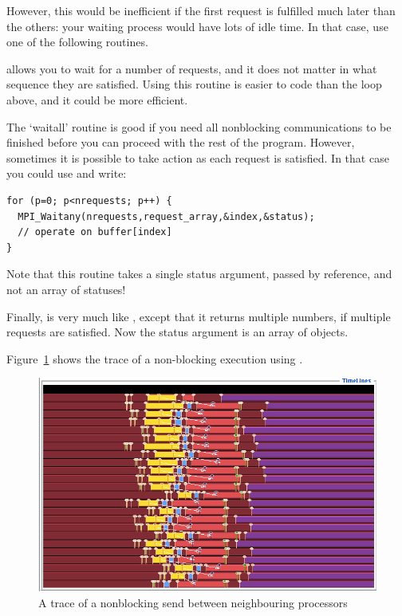 However, this would be inefficient if the first request is fulfilled
much later than the others: your waiting process would have lots of
idle time. In that case, use one of the following routines.

  
 allows you to wait for a number of
requests, and it does not matter in what sequence they are
satisfied. Using this routine is easier to code than the loop above,
and it could be more efficient.



The `waitall' routine is good if you need all nonblocking
communications to be finished before you can proceed with the rest of
the program. However, sometimes it is possible to take action as each
request is satisfied. In that case you could use
 and write:

\begin{lstlisting}
for (p=0; p<nrequests; p++) {
  MPI_Waitany(nrequests,request_array,&index,&status);
  // operate on buffer[index]
}
\end{lstlisting}

Note that this routine takes a single status argument, passed by
reference, and not an array of statuses!


Finally,  is very much like ,
except that it returns multiple numbers, if multiple requests are
satisfied. Now the status argument is an array of 
objects.

Figure~\ref{fig:jump-nonblock} shows the trace of a non-blocking execution
using .
\begin{figure}[ht]
\includegraphics[scale=.4]{graphics/linear-nonblock}
\caption{A trace of a nonblocking send between neighbouring processors}
\label{fig:jump-nonblock}
\end{figure}

